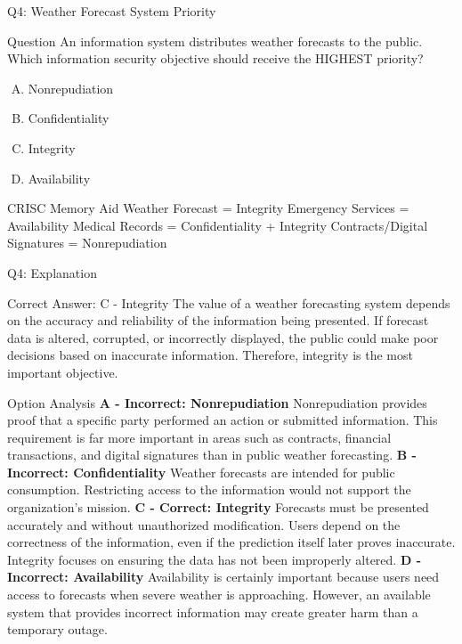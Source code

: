 \documentclass{beamer}
\begin{document}
	
	\begin{frame}{Q4: Weather Forecast System Priority} \begin{block}{Question} An information system distributes weather forecasts to the public. Which information security objective should receive the HIGHEST priority? \end{block} \begin{enumerate}[(A)] \item Nonrepudiation \item Confidentiality \item Integrity \item Availability \end{enumerate} \begin{block}{CRISC Memory Aid} Weather Forecast = Integrity Emergency Services = Availability Medical Records = Confidentiality + Integrity Contracts/Digital Signatures = Nonrepudiation \end{block} \end{frame} \begin{frame}{Q4: Explanation} \footnotesize \begin{block}{Correct Answer: C - Integrity} The value of a weather forecasting system depends on the accuracy and reliability of the information being presented. If forecast data is altered, corrupted, or incorrectly displayed, the public could make poor decisions based on inaccurate information. Therefore, integrity is the most important objective. \end{block} \begin{block}{Option Analysis} \textbf{A - Incorrect: Nonrepudiation} Nonrepudiation provides proof that a specific party performed an action or submitted information. This requirement is far more important in areas such as contracts, financial transactions, and digital signatures than in public weather forecasting. \vspace{0.15cm} \textbf{B - Incorrect: Confidentiality} Weather forecasts are intended for public consumption. Restricting access to the information would not support the organization's mission. \vspace{0.15cm} \textbf{C - Correct: Integrity} Forecasts must be presented accurately and without unauthorized modification. Users depend on the correctness of the information, even if the prediction itself later proves inaccurate. Integrity focuses on ensuring the data has not been improperly altered. \vspace{0.15cm} \textbf{D - Incorrect: Availability} Availability is certainly important because users need access to forecasts when severe weather is approaching. However, an available system that provides incorrect information may create greater harm than a temporary outage. \end{block}  \end{frame}
	
\end{document}
